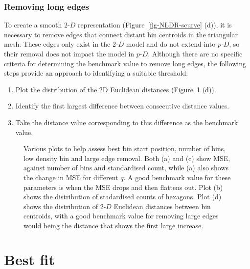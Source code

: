 \documentclass[
  12pt]{article}
\providecommand{\tightlist}{%
  \setlength{\itemsep}{0pt}\setlength{\parskip}{0pt}}\usepackage{longtable,booktabs,array}
\def\tightlist{}
\newcommand\pD{$p\text{-}D$}
\newcommand\gD{$2\text{-}D$}
\begin{document}
\subsubsection{Removing long edges}\label{removing-long-edges}

To create a smooth \gD{} representation (Figure~\ref{fig-NLDR-scurve}
(d)), it is necessary to remove edges that connect distant bin centroids
in the triangular mesh. These edges only exist in the \gD{} model and do
not extend into \pD{}, so their removal does not impact the model in
\pD{}. Although there are no specific criteria for determining the
benchmark value to remove long edges, the following steps provide an
approach to identifying a suitable threshold:

\begin{enumerate}
\def\labelenumi{\arabic{enumi}.}
\tightlist
\item
  Plot the distribution of the 2D Euclidean distances
  (Figure~\ref{fig-param-scurve} (d)).
\item
  Identify the first largest difference between consecutive distance
  values.
\item
  Take the distance value corresponding to this difference as the
  benchmark value.
\end{enumerate}

\begin{figure}[H]


\caption{\label{fig-param-scurve}Various plots to help assess best bin
start position, number of bins, low density bin and large edge removal.
Both (a) and (c) show MSE, against number of bins and standardised
count, while (a) also shows the change in MSE for different \(q\). A
good benchmark value for these parameters is when the MSE drops and then
flattens out. Plot (b) shows the distribution of stadardised counts of
hexagons. Plot (d) shows the distribution of \(2\text{-}D\) Euclidean
distances between bin centroids, with a good benchmark value for
removing large edges would being the distance that shows the first large
increase.}

\end{figure}%

\section{Best fit}\label{best-fit}
\end{document}
